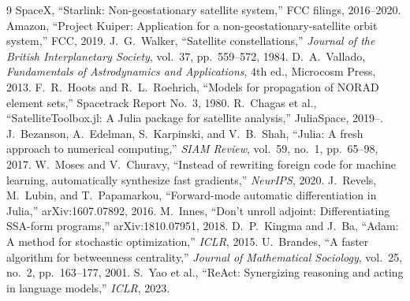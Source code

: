 \documentclass[10pt,twocolumn]{article}
\begin{document}
\balance
\begin{thebibliography}{9}
\small
{} SpaceX, ``Starlink: Non-geostationary satellite system,''
FCC filings, 2016--2020.
 Amazon, ``Project Kuiper: Application for a
non-geostationary-satellite orbit system,'' FCC, 2019.
 J.~G.~Walker, ``Satellite constellations,'' \emph{Journal of the
British Interplanetary Society}, vol.~37, pp.~559--572, 1984.
 D.~A.~Vallado, \emph{Fundamentals of Astrodynamics and
Applications}, 4th ed., Microcosm Press, 2013.
 F.~R.~Hoots and R.~L.~Roehrich, ``Models for propagation of NORAD
element sets,'' Spacetrack Report No.~3, 1980.
 R.~Chagas et al., ``SatelliteToolbox.jl: A Julia
package for satellite analysis,'' JuliaSpace, 2019--.
 J.~Bezanson, A.~Edelman, S.~Karpinski, and V.~B.~Shah, ``Julia: A
fresh approach to numerical computing,'' \emph{SIAM Review}, vol.~59, no.~1,
pp.~65--98, 2017.
 W.~Moses and V.~Churavy, ``Instead of rewriting foreign code for
machine learning, automatically synthesize fast gradients,'' \emph{NeurIPS},
2020.
 J.~Revels, M.~Lubin, and T.~Papamarkou, ``Forward-mode
automatic differentiation in Julia,'' arXiv:1607.07892, 2016.
 M.~Innes, ``Don't unroll adjoint: Differentiating SSA-form
programs,'' arXiv:1810.07951, 2018.
 D.~P.~Kingma and J.~Ba, ``Adam: A method for stochastic
optimization,'' \emph{ICLR}, 2015.
 U.~Brandes, ``A faster algorithm for betweenness centrality,''
\emph{Journal of Mathematical Sociology}, vol.~25, no.~2, pp.~163--177, 2001.
 S.~Yao et al., ``ReAct: Synergizing reasoning and acting in
language models,'' \emph{ICLR}, 2023.
\end{thebibliography}
\end{document}
